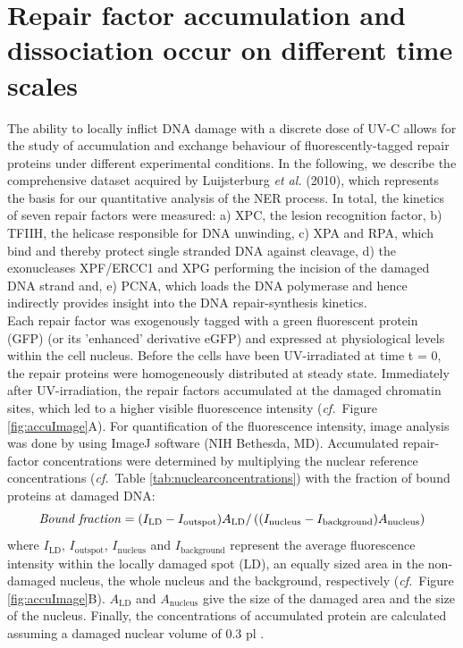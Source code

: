 \section{Repair factor accumulation and dissociation occur on different time scales}
\label{subsec:AccuFlipExp}
The ability to locally inflict DNA damage with a discrete dose of UV-C allows for the study of accumulation and exchange behaviour of fluorescently-tagged repair proteins under different experimental conditions. In the following, we describe the comprehensive dataset acquired by Luijsterburg \textit{et al.} (2010)\cite{Luijsterburg2010}, which represents the basis for our quantitative analysis of the NER process. In total, the kinetics of seven repair factors were measured: a) XPC, the lesion recognition factor, b) TFIIH, the helicase responsible for DNA unwinding, c) XPA and RPA, which bind and thereby protect single stranded DNA against cleavage, d) the exonucleases XPF/ERCC1 and XPG performing the incision of the damaged DNA strand and, e) PCNA, which loads the DNA polymerase and hence indirectly provides insight into the DNA repair-synthesis kinetics. \\
\label{sec:eGFP}
Each repair factor was exogenously tagged with a green fluorescent protein (GFP) (or its 'enhanced' derivative eGFP) and expressed at physiological levels within the cell nucleus. Before the cells have been UV-irradiated at time t = 0, the repair proteins were homogeneously distributed at steady state. Immediately after UV-irradiation, the repair factors accumulated at the damaged chromatin sites, which led to a higher visible fluorescence intensity (\textit{cf.}\ Figure \ref{fig:accuImage}A). For quantification of the fluorescence intensity, image analysis was done by using ImageJ software (NIH Bethesda, MD). Accumulated repair-factor concentrations were determined by multiplying the nuclear reference concentrations (\textit{cf.}\ Table \ref{tab:nuclearconcentrations}) with the fraction of bound proteins at damaged DNA:
%
%
\begin{equation}
\text{\textit{Bound fraction}} = (I_\text{LD} - I_\text{outspot})A_\text{LD}/ \left((I_\text{nucleus} - I_\text{background})A_\text{nucleus}\right)
\label{Eqn:BoundFraction}
\end{equation}     
where $I_\text{LD}$, $I_\text{outspot}$, $I_\text{nucleus}$ and $I_\text{background}$ represent the average fluorescence intensity within the locally damaged spot (LD), an equally sized area in the non-damaged nucleus, the whole nucleus and the background, respectively (\textit{cf.}\ Figure \ref{fig:accuImage}B). $A_\text{LD}$ and $A_\text{nucleus}$ give the size of the damaged area and the size of the nucleus. Finally, the concentrations of accumulated protein are calculated assuming a damaged nuclear volume of 0.3 pl \cite{Luijsterburg2010}.\\    


